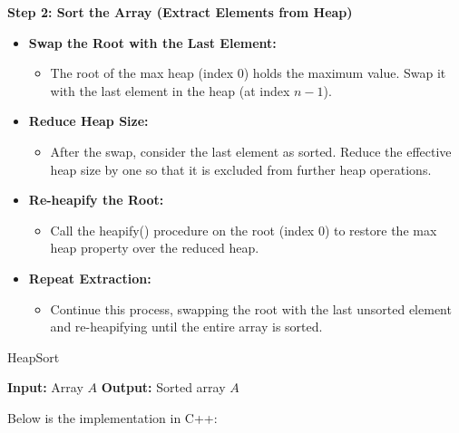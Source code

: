 \textbf{Step 2: Sort the Array (Extract Elements from Heap)}
\begin{itemize}
    \item \textbf{Swap the Root with the Last Element:}
    \begin{itemize}
        \item The root of the max heap (index 0) holds the maximum value. Swap it with the last element in the heap (at index $n-1$).
    \end{itemize}
    \item \textbf{Reduce Heap Size:}
    \begin{itemize}
        \item After the swap, consider the last element as sorted. Reduce the effective heap size by one so that it is excluded from further heap operations.
    \end{itemize}
    \item \textbf{Re-heapify the Root:}
    \begin{itemize}
        \item Call the heapify() procedure on the root (index 0) to restore the max heap property over the reduced heap.
    \end{itemize}
    \item \textbf{Repeat Extraction:}
    \begin{itemize}
        \item Continue this process, swapping the root with the last unsorted element and re-heapifying until the entire array is sorted.
    \end{itemize}
\end{itemize}

\begin{algorithm}
    \caption{HeapSort}
    \begin{algorithmic}[1]
        \State \textbf{Input:} Array $A$
        \State \textbf{Output:} Sorted array $A$
        \State {}
        \State {}
        \State {}
        \EndFor
        \EndFunction
    \end{algorithmic}
\end{algorithm}

\begin{minipage}{\linewidth}
    Below is the implementation in C++:

        
\end{minipage}

